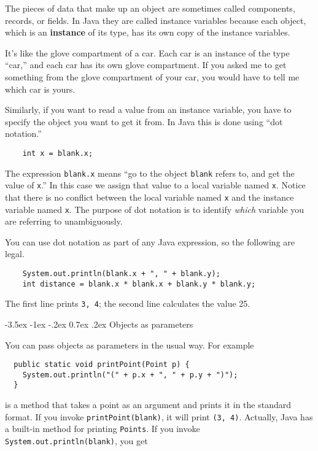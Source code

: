 \documentclass{book}
\makeatletter
\renewcommand{\section}{\@startsection 
    {section} {1} {0mm}%
    {-3.5ex \@plus -1ex \@minus -.2ex}%
    {0.7ex \@plus.2ex}%
    {\normalfont\Large\bfseries}}
\makeatother
\begin{document}
The pieces of data that make up an object are sometimes called
components, records, or fields.  In Java they are called instance
variables because each object, which is an {\bf instance} of its
type, has its own copy of the instance variables.

It's like the glove compartment of a car.  Each car is an instance
of the type ``car,'' and each car has its own glove compartment.  If
you asked me to get something from the glove compartment of your car,
you would have to tell me which car is yours.


Similarly, if you want to read a value from an instance variable, you
have to specify the object you want to get it from.  In Java this is
done using ``dot notation.''

\begin{verbatim}
    int x = blank.x;
\end{verbatim}
%
The expression {\tt blank.x} means ``go to the object {\tt blank}
refers to, and get the value of {\tt x}.''  In this case we assign
that value to a local variable named {\tt x}.  Notice that there is no
conflict between the local variable named {\tt x} and the instance
variable named {\tt x}.  The purpose of dot notation is to identify
{\em which} variable you are referring to unambiguously.

You can use dot notation as part of any Java expression, so the
following are legal.

\begin{verbatim}
    System.out.println(blank.x + ", " + blank.y);
    int distance = blank.x * blank.x + blank.y * blank.y;
\end{verbatim}
%
The first line prints {\tt 3, 4}; the second line calculates
the value 25.

\section{Objects as parameters}

You can pass objects as parameters in the usual way.  For
example

\begin{verbatim}
  public static void printPoint(Point p) {
    System.out.println("(" + p.x + ", " + p.y + ")");
  }
\end{verbatim}
%
is a method that takes a point as an argument and prints it in
the standard format.  If you invoke {\tt printPoint(blank)},
it will print {\tt(3, 4)}.  Actually, Java has a built-in
method for printing {\tt Points}.  If you invoke
{\tt System.out.println(blank)}, you get
\end{document}
